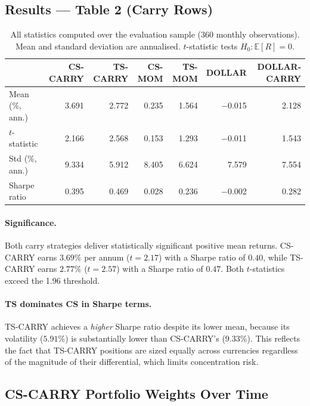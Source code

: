 \documentclass[a4paper,12pt]{article}
\begin{document}
\subsection{Results --- Table 2 (Carry Rows)}

\begin{table}[H]
\centering
\caption{Factor Strategies --- Performance Statistics (Jan 1995 -- Dec 2024)}
\label{tab:table2}
\renewcommand{\arraystretch}{1.3}
\begin{tabular}{lrrrrrr}
\toprule
 & \textbf{CS-CARRY} & \textbf{TS-CARRY} & \textbf{CS-MOM} & \textbf{TS-MOM} & \textbf{DOLLAR} & \textbf{DOLLAR-CARRY} \\
\midrule
Mean (\%, ann.)  & 3.691 & 2.772 & 0.235  & 1.564 & $-$0.015 & 2.128 \\
$t$-statistic    & 2.166 & 2.568 & 0.153  & 1.293 & $-$0.011 & 1.543 \\
Std (\%, ann.)   & 9.334 & 5.912 & 8.405  & 6.624 & 7.579    & 7.554 \\
Sharpe ratio     & 0.395 & 0.469 & 0.028  & 0.236 & $-$0.002 & 0.282 \\
\bottomrule
\end{tabular}
\caption*{\footnotesize All statistics computed over the evaluation sample (360 monthly observations).
Mean and standard deviation are annualised. $t$-statistic tests $H_0: \mathbb{E}[R] = 0$.}
\end{table}

\paragraph{Significance.}
Both carry strategies deliver statistically significant positive mean returns. CS-CARRY
earns $3.69\%$ per annum ($t = 2.17$) with a Sharpe ratio of $0.40$, while TS-CARRY earns
$2.77\%$ ($t = 2.57$) with a Sharpe ratio of $0.47$. Both $t$-statistics exceed the 1.96
threshold.

\paragraph{TS dominates CS in Sharpe terms.}
TS-CARRY achieves a \emph{higher} Sharpe ratio despite its lower mean, because its
volatility ($5.91\%$) is substantially lower than CS-CARRY's ($9.33\%$). This reflects
the fact that TS-CARRY positions are sized equally across currencies regardless of the
magnitude of their differential, which limits concentration risk.

\subsection{CS-CARRY Portfolio Weights Over Time}
\end{document}
